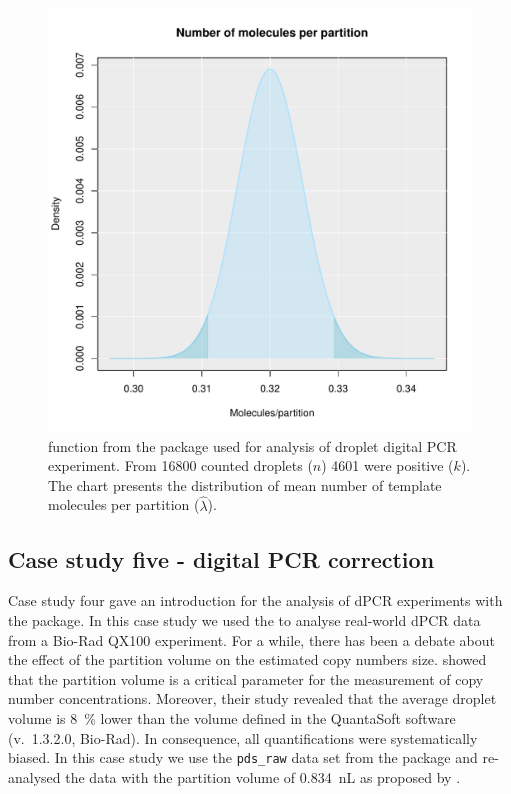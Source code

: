 \begin{figure}[htbp]
  \centering
  \includegraphics[clip=true, width=14cm]{figures/dpcR.pdf}
  \caption{ function from the  package used 
for analysis of droplet digital PCR experiment. From 16800 counted droplets 
($n$) 4601 were positive ($k$). The chart presents the distribution of mean 
number of 
template molecules per partition ($\hat \lambda$). 
}
  \label{figure:dpcR}
\end{figure}

\subsection{Case study five - digital PCR correction}

Case study four gave an introduction for the analysis of dPCR experiments with 
the  package. In this case study we used the  to 
analyse real-world dPCR data from a Bio-Rad QX100 experiment. For a while, there 
has been a debate about the effect of the partition volume on the estimated copy 
numbers size. \citet{corbisier_2015} showed that the partition volume is a 
critical parameter for the measurement of copy number concentrations. Moreover, 
their study revealed that the average droplet volume is 8~\% lower than the 
volume defined in the QuantaSoft software (v.~1.3.2.0, Bio-Rad). In consequence, 
all quantifications were systematically biased. In this case study we use the 
\texttt{pds\_raw} data set from the  package and re-analysed the 
data with the partition volume of 0.834~nL as proposed by 
\citet{corbisier_2015}.


